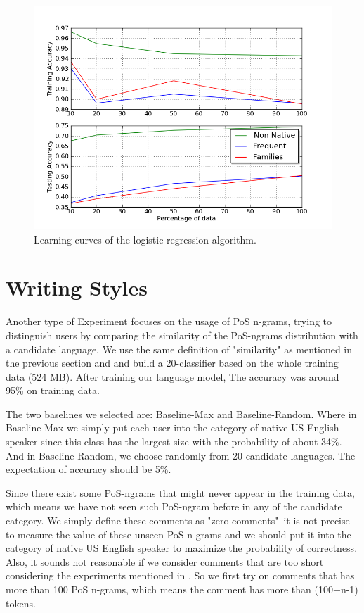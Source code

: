 \documentclass[11pt]{article}
\begin{document}
\begin{figure}[htp]
\centering
\includegraphics[scale=0.45]{combined_lc.png}
\caption{Learning curves of the logistic regression algorithm.}
\label{comb_lc}
\end{figure}





\section{Writing Styles}
\label{conc}
Another type of Experiment focuses on the usage of PoS n-grams, trying to distinguish users by comparing the similarity of the PoS-ngrams distribution with a candidate language. We use the same definition of "similarity" as mentioned in the previous section and \cite {alpaydin2004introduction} and build a 20-classifier based on the whole training data (524 MB). After training our language model, The accuracy was around 95\% on training data.

The two baselines we selected are: Baseline-Max and Baseline-Random. Where in Baseline-Max we simply put each user into the category of native US English speaker since this class has the largest size with the
probability of about 34\%. And in Baseline-Random, we choose randomly from 20 candidate languages. The expectation of accuracy should be 5\%.

Since there exist some PoS-ngrams that might never appear in the training data, which means we have not seen such PoS-ngram before in any of the candidate category. We simply define these comments as "zero comments"--it is not precise to measure the value of these unseen PoS n-grams and we should put it into the category of native US English speaker to maximize the probability of correctness. Also, it sounds not reasonable if we consider comments that are too short considering the experiments mentioned in \cite {wagner2009judging}. So we first try on comments that has more than 100 PoS n-grams, which means the comment has more than (100+n-1) tokens.
\end{document}
